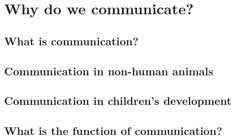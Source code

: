 \chapter{Why do we communicate?}
\label{ch:communication}

\section{What is communication?}

\section{Communication in non-human animals}

\section{Communication in children's development}

\section{What is the function of communication?}
